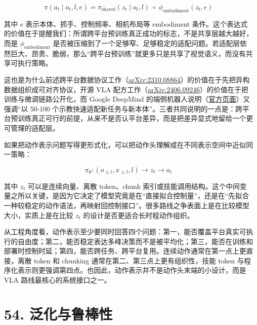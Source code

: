 \begingroup
\scriptsize
\begin{equation*}
\pi(a_t \mid o_t, l, e)
= \pi_{\text{shared}}(z_t \mid o_t, l)\;
\circ\;
\phi_{\text{embodiment}}(z_t, e)
\end{equation*}
\endgroup

其中 \(e\) 表示本体、抓手、控制频率、相机布局等 embodiment 条件。这个表达式的价值在于提醒我们：所谓跨平台预训练真正成功的标志，不是共享层越大越好，而是 \(\phi_{\text{embodiment}}\) 是否被压缩到了一个足够窄、足够稳定的适配问题。若适配层依然巨大、昂贵、脆弱，那么“跨平台预训练”就更多只是共享了视觉语义，而没有共享可执行策略。

这也是为什么前述跨平台数据协议工作（\href{https://arxiv.org/abs/2310.08864}{arXiv:2310.08864}）的价值在于先把异构数据组织成可对齐协议，开源 VLA 配方工作（\href{https://arxiv.org/abs/2406.09246}{arXiv:2406.09246}）的价值在于把训练与微调链路公开化，而 Google DeepMind 的端侧机器人说明（\href{https://deepmind.google/blog/gemini-robotics-on-device-brings-ai-to-local-robotic-devices/}{官方页面}）又强调“以 50-100 个示教快速适配新任务与新本体”。三者共同说明的一点是：跨平台预训练真正可行的前提，从来不是否认平台差异，而是把差异显式地留给一个更可管理的适配层。

如果把动作表示问题写得更形式化，可以把动作头理解成在不同表示空间中近似同一策略：

\begingroup
\footnotesize
\begin{equation*}
\pi_\theta : (o_{\le t}, x_{\le t}, l) \rightarrow z_t \rightarrow a_t
\end{equation*}
\endgroup

其中 \(z_t\) 可以是连续向量、离散 token、chunk 索引或技能调用结构。这个中间变量之所以关键，是因为它决定了模型究竟是在“直接拟合控制量”，还是在“先拟合一种较稳定的动作语法，再映射回控制接口”。很多路线之争表面上是在比较模型大小，实质上是在比较 \(z_t\) 的设计是否更适合长时程动作组织。

从工程角度看，动作表示至少要同时回答四个问题：第一，能否覆盖平台真实可执行的自由度；第二，能否稳定表达多峰决策而不是被平均化；第三，能否在训练和部署时控制时延；第四，能否跨任务、跨平台复用。连续动作通常在第一点上更直接，离散 token 和 chunking 通常在第二、第三点上更有组织性，技能 token 与程序化表示则更强调第四点。也因此，动作表示并不是动作头末端的小设计，而是 VLA 路线最核心的系统接口之一。

\chapter*{54. 泛化与鲁棒性}

